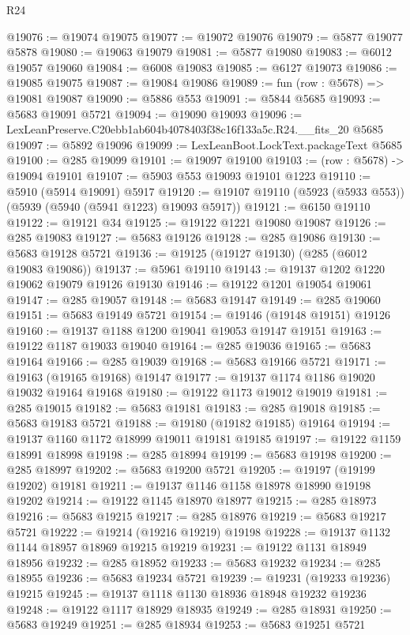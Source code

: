 \begin{lexlean}{R24}
\begin{coremodule}
@19076 := @19074 @19075
@19077 := @19072 @19076
@19079 := @5877 @19077 @5878
@19080 := @19063 @19079
@19081 := @5877 @19080
@19083 := @6012 @19057 @19060
@19084 := @6008 @19083
@19085 := @6127 @19073
@19086 := @19085 @19075
@19087 := @19084 @19086
@19089 := fun (row : @5678) => @19081 @19087
@19090 := @5886 @553
@19091 := @5844 @5685
@19093 := @5683 @19091 @5721
@19094 := @19090 @19093
@19096 := LexLeanPreserve.C20ebb1ab604b4078403f38c16f133a5c.R24.__fits_20 @5685
@19097 := @5892 @19096
@19099 := LexLeanBoot.LockText.packageText @5685
@19100 := @285 @19099
@19101 := @19097 @19100
@19103 := (row : @5678) -> @19094 @19101
@19107 := @5903 @553 @19093 @19101 @1223
@19110 := @5910 (@5914 @19091) @5917
@19120 := @19107 @19110 (@5923 (@5933 @553)) (@5939 (@5940 (@5941 @1223) @19093 @5917))
@19121 := @6150 @19110
@19122 := @19121 @34
@19125 := @19122 @1221 @19080 @19087
@19126 := @285 @19083
@19127 := @5683 @19126
@19128 := @285 @19086
@19130 := @5683 @19128 @5721
@19136 := @19125 (@19127 @19130) (@285 (@6012 @19083 @19086))
@19137 := @5961 @19110
@19143 := @19137 @1202 @1220 @19062 @19079 @19126 @19130
@19146 := @19122 @1201 @19054 @19061
@19147 := @285 @19057
@19148 := @5683 @19147
@19149 := @285 @19060
@19151 := @5683 @19149 @5721
@19154 := @19146 (@19148 @19151) @19126
@19160 := @19137 @1188 @1200 @19041 @19053 @19147 @19151
@19163 := @19122 @1187 @19033 @19040
@19164 := @285 @19036
@19165 := @5683 @19164
@19166 := @285 @19039
@19168 := @5683 @19166 @5721
@19171 := @19163 (@19165 @19168) @19147
@19177 := @19137 @1174 @1186 @19020 @19032 @19164 @19168
@19180 := @19122 @1173 @19012 @19019
@19181 := @285 @19015
@19182 := @5683 @19181
@19183 := @285 @19018
@19185 := @5683 @19183 @5721
@19188 := @19180 (@19182 @19185) @19164
@19194 := @19137 @1160 @1172 @18999 @19011 @19181 @19185
@19197 := @19122 @1159 @18991 @18998
@19198 := @285 @18994
@19199 := @5683 @19198
@19200 := @285 @18997
@19202 := @5683 @19200 @5721
@19205 := @19197 (@19199 @19202) @19181
@19211 := @19137 @1146 @1158 @18978 @18990 @19198 @19202
@19214 := @19122 @1145 @18970 @18977
@19215 := @285 @18973
@19216 := @5683 @19215
@19217 := @285 @18976
@19219 := @5683 @19217 @5721
@19222 := @19214 (@19216 @19219) @19198
@19228 := @19137 @1132 @1144 @18957 @18969 @19215 @19219
@19231 := @19122 @1131 @18949 @18956
@19232 := @285 @18952
@19233 := @5683 @19232
@19234 := @285 @18955
@19236 := @5683 @19234 @5721
@19239 := @19231 (@19233 @19236) @19215
@19245 := @19137 @1118 @1130 @18936 @18948 @19232 @19236
@19248 := @19122 @1117 @18929 @18935
@19249 := @285 @18931
@19250 := @5683 @19249
@19251 := @285 @18934
@19253 := @5683 @19251 @5721

\end{coremodule}
\end{lexlean}
